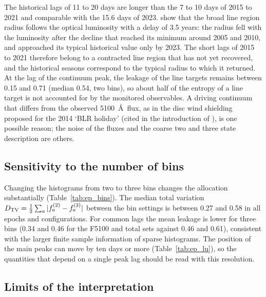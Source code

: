 The historical lags of 11 to 20 days \citep{Lu2022} are longer than the 7 to 10
days of 2015 to 2021 and comparable with the 15.6 days of 2023. \citet{Xi2025}
show that the broad line region radius follows the optical luminosity with a delay of
3.5 years: the radius fell with the luminosity after the decline that reached its
minimum around 2005 and 2010, and approached its typical historical value only by
2023. The short lags of 2015 to 2021 therefore belong to a contracted line region
that has not yet recovered, and the historical seasons correspond to the typical
radius to which it returned. At the lag of the continuum peak, the leakage of the
line targets remains between 0.15 and 0.71 (median 0.54, two bins), so about half of
the entropy of a line target is not accounted for by the monitored observables. A
driving continuum that differs from the observed 5100~\AA\ flux, as in the disc wind
shielding proposed for the 2014 `BLR holiday' (cited in the introduction of
\citealt{Xi2025}), is one possible reason; the noise of the fluxes and the coarse two and three state description are
others.

\subsection{Sensitivity to the number of bins}

Changing the histograms from two to three bins changes the allocation substantially
(Table~\ref{tab:ep_bins}). The median total variation $D_{\rm TV}=\frac12\sum_a|f_a^{(2)}-f_a^{(3)}|$
between the bin settings is between 0.27 and 0.58 in all epochs and
configurations. For common lags the mean leakage is lower for three bins (0.34 and 0.46
for the F5100 and total sets against 0.46 and 0.61), consistent with the larger finite
sample information of sparse histograms. The position of the main peaks can move by
ten days or more (Table~\ref{tab:ep_lu}), so the quantities that depend on a single
peak lag should be read with this resolution.

\begin{SURDtable}
\centering
\caption{Median total variation between two and three bin allocations over lags and
targets, per epoch, for the F5100 set (first three columns) and the total set
(last three), with common, blue leading and red leading lags.}
\label{tab:ep_bins}
\small

\end{SURDtable}

\subsection{Limits of the interpretation}

